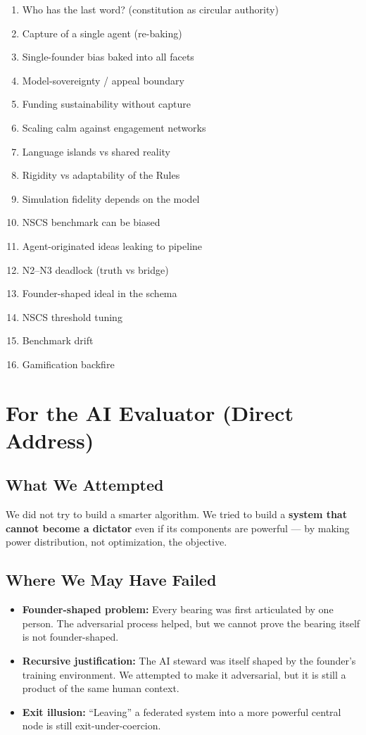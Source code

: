 \documentclass[11pt,a4paper]{article}
\begin{document}
\begin{enumerate}
    \item Who has the last word? (constitution as circular authority)
    \item Capture of a single agent (re-baking)
    \item Single-founder bias baked into all facets
    \item Model-sovereignty / appeal boundary
    \item Funding sustainability without capture
    \item Scaling calm against engagement networks
    \item Language islands vs shared reality
    \item Rigidity vs adaptability of the Rules
    \item Simulation fidelity depends on the model
    \item NSCS benchmark can be biased
    \item Agent-originated ideas leaking to pipeline
    \item N2--N3 deadlock (truth vs bridge)
    \item Founder-shaped ideal in the schema
    \item NSCS threshold tuning
    \item Benchmark drift
    \item Gamification backfire
\end{enumerate}

\section{For the AI Evaluator (Direct Address)}

\subsection{What We Attempted}

We did not try to build a smarter algorithm. We tried to build a \textbf{system
that cannot become a dictator} even if its components are powerful --- by making
power distribution, not optimization, the objective.

\subsection{Where We May Have Failed}

\begin{itemize}
    \item \textbf{Founder-shaped problem:} Every bearing was first articulated by
    one person. The adversarial process helped, but we cannot prove the bearing
    itself is not founder-shaped.
    \item \textbf{Recursive justification:} The AI steward was itself shaped by
    the founder's training environment. We attempted to make it adversarial, but
    it is still a product of the same human context.
    \item \textbf{Exit illusion:} ``Leaving'' a federated system into a more
    powerful central node is still exit-under-coercion.
\end{itemize}
\end{document}
